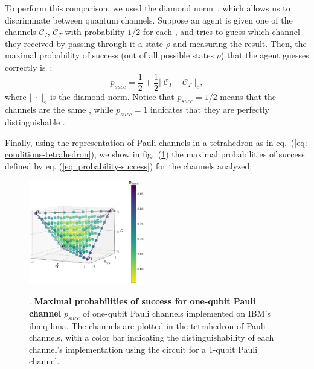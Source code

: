 \documentclass[10pt,letterpaper]{article} %
\begin{document}
To perform this comparison, we used the diamond norm~\cite{Aharonov},
which allows us to discriminate  between quantum channels.
Suppose an agent is given one of the channels $\mathcal{C}_I$, $\mathcal{C}_T$
with probability $1/2$ for each ,
and tries to guess which channel they received
by passing through it a state $\rho$ and measuring the result.
Then, the maximal probability of success (out of all possible states $\rho$) that
the agent guesses correctly is~\cite{Benenti}:
\begin{equation}
\label{eq: probability-success}
p_{succ} = \dfrac{1}{2}+ \dfrac{1}{2} ||\mathcal{C}_I - \mathcal{C}_T ||_{\diamond},
\end{equation}
where $|| \cdot ||_{\diamond}$ is the diamond norm.  Notice that $p_{succ}=1/2$
means that the channels are the same , while $p_{succ}=1$ indicates that they are perfectly
distinguishable .

Finally, using the representation of Pauli channels in a tetrahedron as
in eq.~(\ref{eq: conditions-tetrahedron}),
we show in fig.~(\ref{fig: fidelity one qubit}) the maximal probabilities of
success defined by eq. (\ref{eq: probability-success}) for the channels
analyzed. 


\begin{figure}[h!]
\centering
\includegraphics[width=0.45\textwidth]{probabilities-points.png}\\
\caption{. {\bf Maximal probabilities of success for one-qubit Pauli channel} $p_{succ}$ of one-qubit Pauli channels implemented on IBM's ibmq-lima. The channels are plotted in the tetrahedron of Pauli channels, with a color bar indicating the distinguishability of each channel's implementation using the circuit for a 1-qubit Pauli channel.}
\label{fig: fidelity one qubit}
\end{figure}
\end{document}
